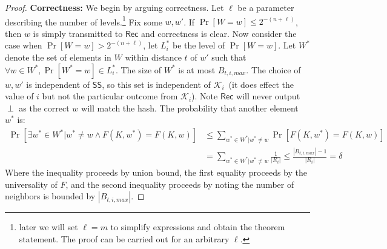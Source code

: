 \documentclass[11pt]{article}
\newcommand{\class}[1]{{\ensuremath{\mathsf{#1}}}}
\newcommand{\sketch}{\ensuremath{\class{SS}}\xspace}
\newcommand{\rec}{\ensuremath{\class{Rec}}\xspace}
\begin{document}
\begin{proof}
\textbf{Correctness:}  We begin by arguing correctness.  Let $\ell$ be a parameter describing the number of levels.\footnote{later we will set $\ell = m$ to simplify expressions and obtain the theorem statement.  The proof can be carried out for an arbitrary $\ell$.}  Fix some $w, w'$.  If $\Pr[W=w]\le 2^{-(n+\ell)}$, then $w$ is simply transmitted to $\rec$ and correctness is clear.  Now consider the case when $\Pr[W=w]> 2^{-(n+\ell)}$, let $L_i^*$ be the level of $\Pr[W=w]$.
Let $W^*$ denote the set of elements in $W$ within distance $t$ of $w'$ such that $\forall w \in W^*, \Pr[W^*=w]\in L_i^*$. The size of $W^*$ is at most $B_{t, i, max}$. The choice of $w, w'$ is independent of $\sketch$, so this set is independent of $\mathcal{K}_i$~(it does effect the value of $i$ but not the particular outcome from $\mathcal{K}_i$).  Note $\rec$ will never output $\perp$ as the correct $w$ will match the hash.  The probability that another element $w^*$ is:
\begin{align*}
\Pr[\exists w^* \in W^* |w^* \neq w \wedge F(K, w^*) = F(K, w)] &\le \sum_{w^*\in W^* | w^*\neq w} \Pr[F(K, w^*) = F(K, w)] \\
 &= \sum_{w^*\in W^* | w^*\neq w} \frac{1}{|R_i|} \le \frac{|B_{t, i, max}|-1}{|R_i|} = \delta
\end{align*}
Where the inequality proceeds by union bound, the first equality proceeds by the universality of $F$, and the second inequality proceeds by noting the number of neighbors is bounded by $|B_{t, i, max}|$.  


\end{proof}
\end{document}
